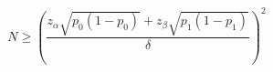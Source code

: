 \documentclass[12pt]{article}
\begin{document}
\pagestyle{empty}
\large

\[
N \ge \left( \frac{z_{\alpha} \sqrt{p_0(1 - p_0)} + z_{\beta} \sqrt{p_1(1 - p_1)}} {\delta} \right) ^2
\]
\end{document}
